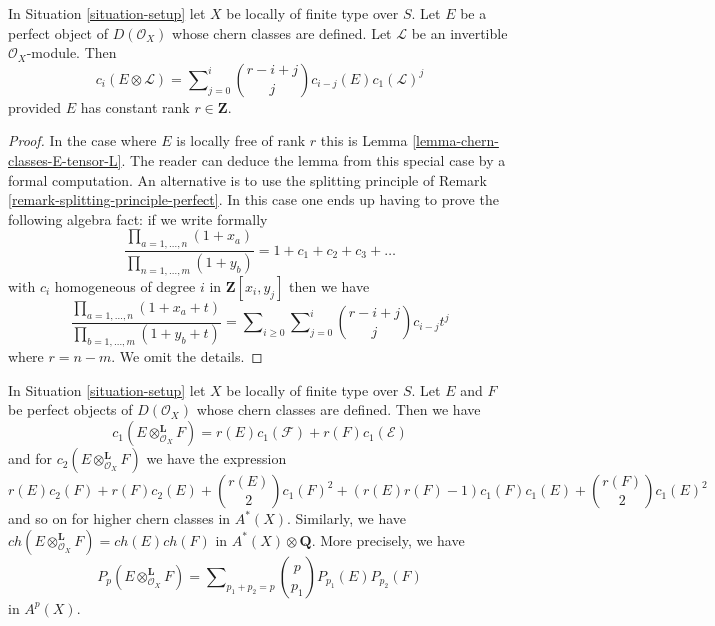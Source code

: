 \begin{lemma}
\label{lemma-chern-class-perfect-tensor-invertible}
In Situation \ref{situation-setup} let $X$ be locally of finite type over $S$.
Let $E$ be a perfect object of $D(\mathcal{O}_X)$ whose chern classes
are defined.
Let $\mathcal{L}$ be an invertible $\mathcal{O}_X$-module. Then
$$
c_i(E \otimes \mathcal{L}) =
\sum\nolimits_{j = 0}^i
\binom{r - i + j}{j} c_{i - j}(E) c_1(\mathcal{L})^j
$$
provided $E$ has constant rank $r \in \mathbf{Z}$.
\end{lemma}

\begin{proof}
In the case where $E$ is locally free of rank $r$ this is
Lemma \ref{lemma-chern-classes-E-tensor-L}. The reader can deduce
the lemma from this special case by a formal computation.
An alternative is to use the splitting principle of
Remark \ref{remark-splitting-principle-perfect}.
In this case one ends up having to prove the following
algebra fact: if we write formally
$$
\frac{\prod_{a = 1, \ldots, n} (1 + x_a)}{\prod_{n = 1, \ldots, m} (1 + y_b)}
= 1 + c_1 + c_2 + c_3 + \ldots
$$
with $c_i$ homogeneous of degree $i$
in $\mathbf{Z}[x_i, y_j]$ then we have
$$
\frac{\prod_{a = 1, \ldots, n} (1 + x_a + t)}{\prod_{b = 1, \ldots, m} (1 + y_b + t)}
= \sum\nolimits_{i \geq 0} \sum\nolimits_{j = 0}^i
\binom{r - i + j}{j} c_{i - j} t^j
$$
where $r = n - m$. We omit the details.
\end{proof}

\begin{lemma}
\label{lemma-chern-classes-perfect-tensor-product}
In Situation \ref{situation-setup} let $X$ be locally of finite type over $S$.
Let $E$ and $F$ be perfect objects of $D(\mathcal{O}_X)$ whose chern classes
are defined. Then we have
$$
c_1(E \otimes_{\mathcal{O}_X}^\mathbf{L} F) =
r(E) c_1(\mathcal{F}) + r(F) c_1(\mathcal{E})
$$
and for $c_2(E \otimes_{\mathcal{O}_X}^\mathbf{L} F)$ we have the expression
$$
r(E) c_2(F) + r(F) c_2(E) + {r(E) \choose 2} c_1(F)^2 +
(r(E)r(F) - 1) c_1(F)c_1(E) + {r(F) \choose 2} c_1(E)^2
$$
and so on for higher chern classes in $A^*(X)$. Similarly, we have
$ch(E \otimes_{\mathcal{O}_X}^\mathbf{L} F) = ch(E) ch(F)$
in $A^*(X) \otimes \mathbf{Q}$. More precisely, we have
$$
P_p(E \otimes_{\mathcal{O}_X}^\mathbf{L} F) = \sum\nolimits_{p_1 + p_2 = p}
{p \choose p_1} P_{p_1}(E) P_{p_2}(F)
$$
in $A^p(X)$.
\end{lemma}


